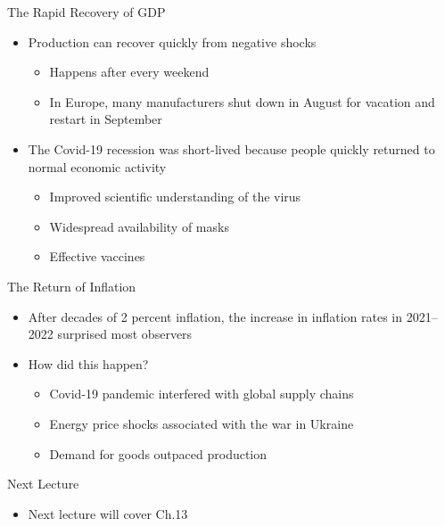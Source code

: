 \documentclass[aspectratio=1610]{beamer}
\begin{document}
\begin{frame}[wide]{The Rapid Recovery of GDP }
	\begin{itemize}
		\item Production can recover quickly from negative shocks
		\vspace{2mm}
		\begin{itemize}
			\item Happens after every weekend
			\item In Europe, many manufacturers shut down in August for vacation and restart in September
		\end{itemize}
		\vspace{4mm}
		\item The Covid-19 recession was short-lived because people quickly returned to normal economic activity
		\vspace{2mm}
		\begin{itemize}
			\item Improved scientific understanding of the virus
			\item Widespread availability of masks
			\item Effective vaccines
		\end{itemize}		
	\end{itemize}
\end{frame}


\begin{frame}[wide]{The Return of Inflation}
	\begin{itemize}
		\item After decades of 2 percent inflation, the increase in inflation rates in 2021–2022 surprised most observers
		\vspace{6mm}
		\item How did this happen?
		\vspace{2mm}
		\begin{itemize}
			\item Covid-19 pandemic interfered with global supply chains
			\item Energy price shocks associated with the war in Ukraine
			\item Demand for goods outpaced production
		\end{itemize}
	\end{itemize}
\end{frame}

\begin{frame}[wide]{Next Lecture}
	\begin{itemize}
		\item Next lecture will cover Ch.13
	\end{itemize}
\end{frame}
\end{document}
